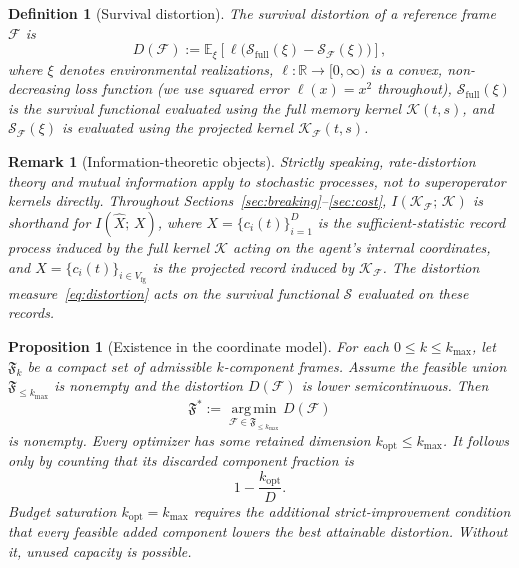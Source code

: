 \documentclass[12pt]{article}
\newtheorem{proposition}[theorem]{Proposition}
\newtheorem{definition}[theorem]{Definition}
\newtheorem{remark}[theorem]{Remark}
\begin{document}
\begin{definition}[Survival distortion]
\label{def:survival_distortion}
The \emph{survival distortion} of a reference frame
$\mathcal{F}$ is
\begin{equation}
\label{eq:distortion}
D(\mathcal{F})
:= \mathbb{E}_{\xi}\!\left[
  \ell\!\bigl(\mathcal{S}_{\mathrm{full}}(\xi)
  - \mathcal{S}_{\mathcal{F}}(\xi)\bigr)
\right],
\end{equation}
where $\xi$ denotes environmental realizations,
$\ell: \mathbb{R} \to [0,\infty)$ is a convex,
non-decreasing loss function (we use squared error
$\ell(x) = x^2$ throughout),
$\mathcal{S}_{\mathrm{full}}(\xi)$ is the survival
functional evaluated using the full memory kernel
$\mathcal{K}(t,s)$, and $\mathcal{S}_{\mathcal{F}}(\xi)$
is evaluated using the projected kernel
$\mathcal{K}_{\mathcal{F}}(t,s)$.
\end{definition}

\begin{remark}[Information-theoretic objects]
\label{rem:info_objects}
Strictly speaking, rate-distortion theory and mutual
information apply to stochastic processes, not to
superoperator kernels directly.
Throughout
Sections~\ref{sec:breaking}--\ref{sec:cost},
$I(\mathcal{K}_{\mathcal{F}};\,\mathcal{K})$ is shorthand
for $I(\hat{X};\,X)$, where
$X = \{c_i(t)\}_{i=1}^{D}$ is the sufficient-statistic
record process induced by the full kernel $\mathcal{K}$
acting on the agent's internal coordinates, and
$\hat{X} = \{c_i(t)\}_{i \in V_{\mathrm{fg}}}$ is the
projected record induced by
$\mathcal{K}_{\mathcal{F}}$.
The distortion measure~\eqref{eq:distortion} acts on the
survival functional $\mathcal{S}$ evaluated on these
records.
\end{remark}

\begin{proposition}[Existence in the coordinate model]
\label{prop:compression_existence}
For each $0\leq k\leq k_{\max}$, let $\mathfrak F_k$ be a
compact set of admissible $k$-component frames.  Assume the feasible
union $\mathfrak F_{\leq k_{\max}}$ is nonempty and the distortion
$D(\mathcal F)$ is lower semicontinuous.  Then
\begin{equation}
\label{eq:k_star}
\mathfrak F^*:=\operatorname*{arg\,min}_{
\mathcal F\in\mathfrak F_{\leq k_{\max}}}D(\mathcal F)
\end{equation}
is nonempty.  Every optimizer has some retained dimension
$k_{\mathrm{opt}}\leq k_{\max}$.  It follows only by counting that its
discarded component fraction is
\begin{equation}
\label{eq:discard_fraction}
1-\frac{k_{\mathrm{opt}}}{D}.
\end{equation}
Budget saturation $k_{\mathrm{opt}}=k_{\max}$ requires the additional
strict-improvement condition that every feasible added component lowers
the best attainable distortion.  Without it, unused capacity is
possible.
\end{proposition}
\end{document}
